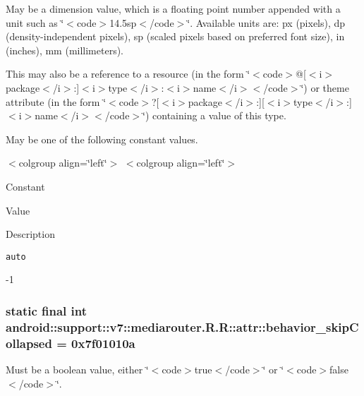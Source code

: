 May be a dimension value, which is a floating point number appended with a unit such as \char`\"{}$<$code$>$14.5sp$<$/code$>$\char`\"{}. Available units are: px (pixels), dp (density-independent pixels), sp (scaled pixels based on preferred font size), in (inches), mm (millimeters). 

This may also be a reference to a resource (in the form \char`\"{}$<$code$>$@\mbox{[}$<$i$>$package$<$/i$>$:\mbox{]}$<$i$>$type$<$/i$>$:$<$i$>$name$<$/i$>$$<$/code$>$\char`\"{}) or theme attribute (in the form \char`\"{}$<$code$>$?\mbox{[}$<$i$>$package$<$/i$>$:\mbox{]}\mbox{[}$<$i$>$type$<$/i$>$:\mbox{]}$<$i$>$name$<$/i$>$$<$/code$>$\char`\"{}) containing a value of this type. 

May be one of the following constant values. \begin{TabularC}{0}
\hline
\end{TabularC}
$<$colgroup align=\char`\"{}left\char`\"{}$>$ $<$colgroup align=\char`\"{}left\char`\"{}$>$ 

Constant

Value

Description 

{\tt auto}

-1\hypertarget{classandroid_1_1support_1_1v7_1_1mediarouter_1_1_r_1_1attr_e90cd962a016b59e85ddba02e2896f39}{
\subsubsection[{behavior\_\-skipCollapsed}]{\setlength{\rightskip}{0pt plus 5cm}static final int android::support::v7::mediarouter.R.R::attr::behavior\_\-skipCollapsed = 0x7f01010a}}
\label{classandroid_1_1support_1_1v7_1_1mediarouter_1_1_r_1_1attr_e90cd962a016b59e85ddba02e2896f39}


Must be a boolean value, either \char`\"{}$<$code$>$true$<$/code$>$\char`\"{} or \char`\"{}$<$code$>$false$<$/code$>$\char`\"{}. 

